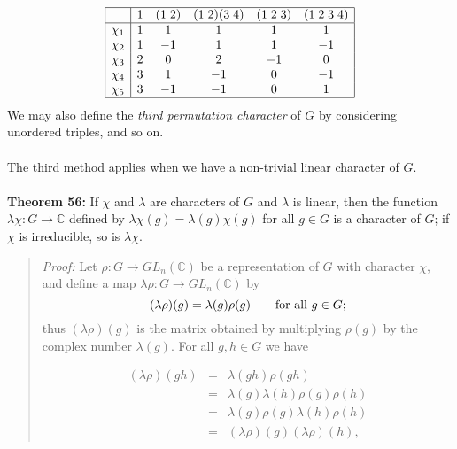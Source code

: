 {$$
\begin{array}{|c|ccccc|}
\hline
&1&(1\;2)&(1\;2)(3\;4)&(1\;2\;3)&(1\;2\;3\;4)\\
\hline
\chi_1&1&1&1&1&1\\
\chi_2&1&-1&1&1&-1\\
\chi_3&2&0&2&-1&0\\
\chi_4&3&1&-1&0&-1\\
\chi_5&3&-1&-1&0&1\\
\hline
\end{array}
$$
We may also define the \emph{third permutation character} of $G$ by
considering unordered triples, and so on.
\\
\\
The third method applies when we have a non-trivial linear character of
$G$.
\\
\\
{\bf Theorem 56:} If $\chi$ and $\lambda$ are characters of
$G$ and $\lambda$ is linear, then the function
$\lambda\chi:G\rightarrow{\mathbb C}$ defined by
$\lambda\chi(g)=\lambda(g)\chi(g)$ for all $g\in G$ is a character of $G$;
if $\chi$ is irreducible, so is $\lambda\chi$.
\begin{quote}
\emph{Proof:}
Let $\rho:G\rightarrow GL_n({\mathbb C})$ be a representation of $G$ with character
$\chi$, and define a map $\lambda\rho: G \rightarrow GL_n({\mathbb C})$ by
$$(\lambda\rho)(g)=\lambda(g)\rho(g)\qquad\hbox{for all }g \in G;$$
thus $(\lambda\rho)(g)$ is the matrix obtained by multiplying $\rho(g)$ by the
complex number $\lambda(g)$. For all $g,h\in G$ we have

\begin{eqnarray*}
(\lambda\rho)(gh)\!\!\!\!&=&\!\!\!\!\lambda(gh)\rho(gh)\\
\!\!\!\!&=&\!\!\!\!\lambda(g)\lambda(h)\rho(g)\rho(h)\\
\!\!\!\!&=&\!\!\!\!\lambda(g)\rho(g)\lambda(h)\rho(h)\\
\!\!\!\!&=&\!\!\!\!(\lambda\rho)(g)(\lambda\rho)(h),
\end{eqnarray*}


\end{quote}}
